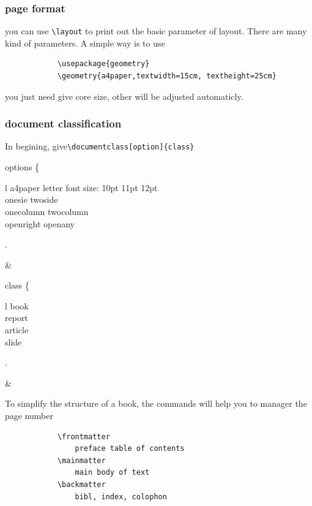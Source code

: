 \documentclass[a4paper,12pt,twoside]{book}
\begin{document}
		\subsubsection{page format}
			you can use \verb=\layout= to print out the basic parameter of layout. There are many kind of parameters. A simple way is to use
			\begin{verbatim}
			\usepackage{geometry}
			\geometry{a4paper,textwidth=15cm, textheight=25cm}
			\end{verbatim}
			you just need give core size, other will be adjusted automaticly.
		\subsubsection{document classification}
			In begining, give\verb=\documentclass[option]{class}= \par
			\begin{flalign*}
			\begin{split}
			\textrm{options} \left\{ \begin{array}{l}
			\textrm{a4paper letter}
			\textrm{font size: 10pt 11pt 12pt } \\
			\textrm{onesie twoside} \\
			\textrm{onecolumn twocolumn}\\
			\textrm{openright openany}\\
			\end{array} \right.
			\end{split}&
			\end{flalign*}

			\begin{flalign*}
			\begin{split}
			\textrm{class} \left\{ \begin{array}{l}
				\textrm{book} \\ \textrm{report} \\ \textrm{article} \\ \textrm{slide}
				\end{array} \right.
			\end{split}&
			\end{flalign*}

			To simplify the structure of a book, the commands will help you to manager the page number
			\begin{verbatim}
			\frontmatter
				preface table of contents
			\mainmatter
				main body of text
			\backmatter
				bibl, index, colophon
			\end{verbatim}	
\end{document}
